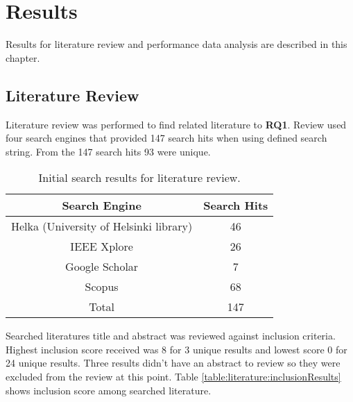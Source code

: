 \chapter{Results\label{results}}
Results for literature review and performance data analysis are described in this chapter.

\section{Literature Review}
Literature review was performed to find related literature to \textbf{RQ1}.
Review used four search engines that provided 147 search hits when using defined search string.
From the 147 search hits 93 were unique.
\begin{table}[ht!]
    \begin{tabular}{|c c|} 
        \hline
        Search Engine
        & Search Hits
        \\ 
        \hline\hline
        Helka (University of Helsinki library)
        & 46
        \\ 
        
        IEEE Xplore
        & 26
        \\ 
        
        Google Scholar
        & 7
        \\ 
        
        Scopus
        & 68
        \\ 
        \hline
        Total
        & 147
        \\ 
        \hline
    \end{tabular}    
    \caption{Initial search results for literature review.}
    \label{table:literature:initialSearchResults}
\end{table}
Searched literatures title and abstract was reviewed against inclusion criteria.
Highest inclusion score received was 8 for 3 unique results and lowest score 0 for 24 unique results.
Three results didn't have an abstract to review so they were excluded from the review at this point.
Table \ref{table:literature:inclusionResults} shows inclusion score among searched literature.
